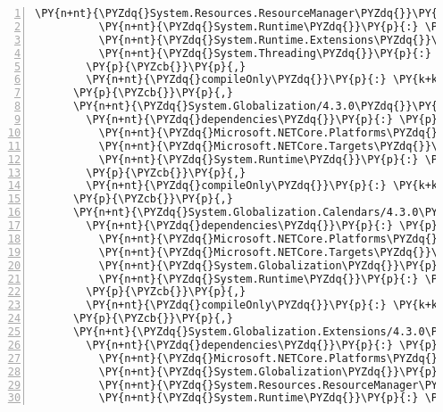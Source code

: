 \begin{Verbatim}[commandchars=\\\{\},numbers=left,firstnumber=1,stepnumber=1,numberblanklines=0]
          \PY{n+nt}{\PYZdq{}System.Resources.ResourceManager\PYZdq{}}\PY{p}{:} \PY{l+s+s2}{\PYZdq{}4.3.0\PYZdq{}}\PY{p}{,}
          \PY{n+nt}{\PYZdq{}System.Runtime\PYZdq{}}\PY{p}{:} \PY{l+s+s2}{\PYZdq{}4.3.0\PYZdq{}}\PY{p}{,}
          \PY{n+nt}{\PYZdq{}System.Runtime.Extensions\PYZdq{}}\PY{p}{:} \PY{l+s+s2}{\PYZdq{}4.3.0\PYZdq{}}\PY{p}{,}
          \PY{n+nt}{\PYZdq{}System.Threading\PYZdq{}}\PY{p}{:} \PY{l+s+s2}{\PYZdq{}4.3.0\PYZdq{}}
        \PY{p}{\PYZcb{}}\PY{p}{,}
        \PY{n+nt}{\PYZdq{}compileOnly\PYZdq{}}\PY{p}{:} \PY{k+kc}{true}
      \PY{p}{\PYZcb{}}\PY{p}{,}
      \PY{n+nt}{\PYZdq{}System.Globalization/4.3.0\PYZdq{}}\PY{p}{:} \PY{p}{\PYZob{}}
        \PY{n+nt}{\PYZdq{}dependencies\PYZdq{}}\PY{p}{:} \PY{p}{\PYZob{}}
          \PY{n+nt}{\PYZdq{}Microsoft.NETCore.Platforms\PYZdq{}}\PY{p}{:} \PY{l+s+s2}{\PYZdq{}2.1.0\PYZhy{}rc1\PYZdq{}}\PY{p}{,}
          \PY{n+nt}{\PYZdq{}Microsoft.NETCore.Targets\PYZdq{}}\PY{p}{:} \PY{l+s+s2}{\PYZdq{}2.1.0\PYZhy{}rc1\PYZdq{}}\PY{p}{,}
          \PY{n+nt}{\PYZdq{}System.Runtime\PYZdq{}}\PY{p}{:} \PY{l+s+s2}{\PYZdq{}4.3.0\PYZdq{}}
        \PY{p}{\PYZcb{}}\PY{p}{,}
        \PY{n+nt}{\PYZdq{}compileOnly\PYZdq{}}\PY{p}{:} \PY{k+kc}{true}
      \PY{p}{\PYZcb{}}\PY{p}{,}
      \PY{n+nt}{\PYZdq{}System.Globalization.Calendars/4.3.0\PYZdq{}}\PY{p}{:} \PY{p}{\PYZob{}}
        \PY{n+nt}{\PYZdq{}dependencies\PYZdq{}}\PY{p}{:} \PY{p}{\PYZob{}}
          \PY{n+nt}{\PYZdq{}Microsoft.NETCore.Platforms\PYZdq{}}\PY{p}{:} \PY{l+s+s2}{\PYZdq{}2.1.0\PYZhy{}rc1\PYZdq{}}\PY{p}{,}
          \PY{n+nt}{\PYZdq{}Microsoft.NETCore.Targets\PYZdq{}}\PY{p}{:} \PY{l+s+s2}{\PYZdq{}2.1.0\PYZhy{}rc1\PYZdq{}}\PY{p}{,}
          \PY{n+nt}{\PYZdq{}System.Globalization\PYZdq{}}\PY{p}{:} \PY{l+s+s2}{\PYZdq{}4.3.0\PYZdq{}}\PY{p}{,}
          \PY{n+nt}{\PYZdq{}System.Runtime\PYZdq{}}\PY{p}{:} \PY{l+s+s2}{\PYZdq{}4.3.0\PYZdq{}}
        \PY{p}{\PYZcb{}}\PY{p}{,}
        \PY{n+nt}{\PYZdq{}compileOnly\PYZdq{}}\PY{p}{:} \PY{k+kc}{true}
      \PY{p}{\PYZcb{}}\PY{p}{,}
      \PY{n+nt}{\PYZdq{}System.Globalization.Extensions/4.3.0\PYZdq{}}\PY{p}{:} \PY{p}{\PYZob{}}
        \PY{n+nt}{\PYZdq{}dependencies\PYZdq{}}\PY{p}{:} \PY{p}{\PYZob{}}
          \PY{n+nt}{\PYZdq{}Microsoft.NETCore.Platforms\PYZdq{}}\PY{p}{:} \PY{l+s+s2}{\PYZdq{}2.1.0\PYZhy{}rc1\PYZdq{}}\PY{p}{,}
          \PY{n+nt}{\PYZdq{}System.Globalization\PYZdq{}}\PY{p}{:} \PY{l+s+s2}{\PYZdq{}4.3.0\PYZdq{}}\PY{p}{,}
          \PY{n+nt}{\PYZdq{}System.Resources.ResourceManager\PYZdq{}}\PY{p}{:} \PY{l+s+s2}{\PYZdq{}4.3.0\PYZdq{}}\PY{p}{,}
          \PY{n+nt}{\PYZdq{}System.Runtime\PYZdq{}}\PY{p}{:} \PY{l+s+s2}{\PYZdq{}4.3.0\PYZdq{}}\PY{p}{,}

\end{Verbatim}
